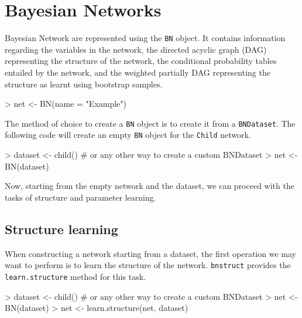 \documentclass{article}
\newcommand{\Robject}[1]{{\texttt{#1}}}
\newcommand{\Rpackage}[1]{{\texttt{#1}}}
\newcommand{\Rmethod}[1]{{\texttt{#1}}}
\begin{document}
\section{Bayesian Networks}
Bayesian Network are represented using the \Robject{BN} object. It contains information regarding the variables in the network,
the directed acyclic graph (DAG) representing the structure of the network, the conditional probability tables entailed by 
the network, and the weighted partially DAG representing the structure as learnt using bootstrap samples.

\begin{Schunk}
\begin{Sinput}
> net <- BN(name = "Example")
\end{Sinput}
\end{Schunk}


The method of choice to create a \Robject{BN} object is to create it from a \Robject{BNDataset}.
The following code will create an empty \Robject{BN} object for the \texttt{Child} network.
\begin{Schunk}
\begin{Sinput}
> dataset <- child() # or any other way to create a custom BNDataset
> net     <- BN(dataset)
\end{Sinput}
\end{Schunk}


Now, starting from the empty network and the dataset, we can proceed with the tasks of structure and parameter learning.

\subsection{Structure learning}
When constructing a network starting from a dataset, the first operation we may want to perform is to learn
the structure of the network. \Rpackage{bnstruct} provides the \Rmethod{learn.structure} method for this task.
\begin{Schunk}
\begin{Sinput}
> dataset <- child() # or any other way to create a custom BNDataset
> net     <- BN(dataset)
> net     <- learn.structure(net, dataset)
\end{Sinput}
\end{Schunk}
\end{document}
